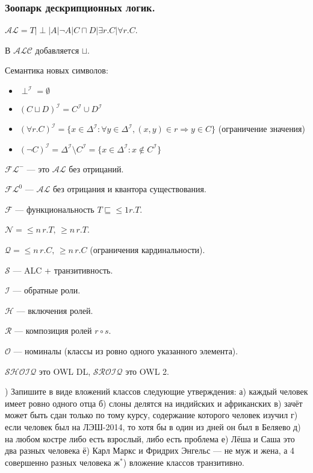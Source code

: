 \documentclass[12pt]{article}
\begin{document}
\pagebreak







\subsubsection*{Зоопарк дескрипционных логик.}
$\mathcal{AL} = T | \perp | A | \lnot A | C\sqcap D | \exists r.C | \forall r.C$.

В $\mathcal{ALC}$ добавляется $\sqcup$.

Семантика новых символов:
\begin{itemize}
\item $\perp^\mathcal{I} = \emptyset$
\item $(C\sqcup D)^\mathcal{I} = C^\mathcal{I} \cup D^\mathcal{I}$
\item $(\forall r.C)^\mathcal{I} = \{x\in\Delta^\mathcal{I}\colon \forall y\in\Delta^\mathcal{I}, (x,y)\in r \Rightarrow y\in C\}$
      (ограничение значения)
\item $(\lnot C)^\mathcal{I} = \Delta^\mathcal{I}\setminus C^\mathcal{I} = \{x\in\Delta^\mathcal{I}\colon x\notin C^\mathcal{I}\}$
\end{itemize}

$\mathcal{FL}^-$ --- это $\mathcal{AL}$ без отрицаний.

$\mathcal{FL}^0$ --- $\mathcal{AL}$ без отрицания и квантора существования.


$\mathcal{F}$ --- функциональность $T\sqsubseteq \leq 1 r.T$.

$\mathcal{N} = \leq n \, r.T,\,\geq n\,r.T$.

$\mathcal{Q} = \leq n \, r.C,\,\geq n\,r.C$ (ограничения кардинальности).

$\mathcal{S}$ --- ALC + транзитивность.

$\mathcal{I}$ --- обратные роли.

$\mathcal{H}$ --- включения ролей.

$\mathcal{R}$ --- композиция ролей $r\circ s$.

$\mathcal{O}$ --- номиналы (классы из ровно одного указанного элемента).


$\mathcal{SHOIQ}$ это OWL DL, $\mathcal{SROIQ}$ это OWL 2.


\z) Запишите в виде вложений классов следующие утверждения:
а) каждый человек имеет ровно одного отца
б) слоны делятся на индийских и африканских
в) зачёт может быть сдан только по тому курсу, содержание которого человек изучил
г) если человек был на ЛЭШ-2014, то хотя бы в один из дней он был в Беляево
д) на любом костре либо есть взрослый, либо есть проблема
е) Лёша и Саша это два разных человека
ё) Карл Маркс и Фридрих Энгельс --- не муж и жена, а 4 совершенно разных человека
$\mbox{ж}^*$) вложение классов транзитивно.
\end{document}
